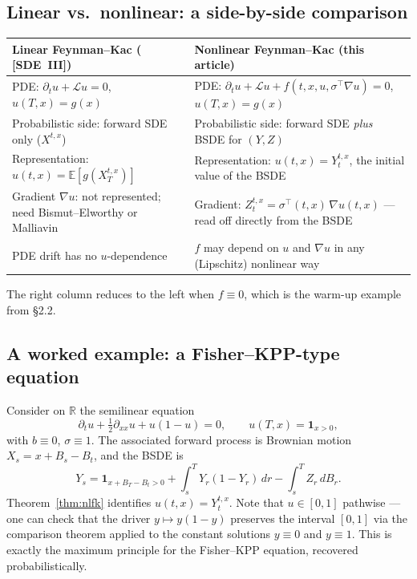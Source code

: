 \documentclass{article}
\newcommand{\E}{\mathbb{E}}
\newcommand{\R}{\mathbb{R}}
\newcommand{\Lc}{\mathcal{L}}
\begin{document}
\subsection{Linear vs.\ nonlinear: a side-by-side comparison}

\begin{center}
\begin{tabular}{p{}|p{}}
\textbf{Linear Feynman--Kac (\,[SDE~III])} & \textbf{Nonlinear Feynman--Kac (this article)} \\
\hline
PDE: $\partial_t u + \Lc u = 0$, $u(T, x) = g(x)$ &
PDE: $\partial_t u + \Lc u + f(t, x, u, \sigma^{\top} \nabla u) = 0$, $u(T, x) = g(x)$ \\
\hline
Probabilistic side: forward SDE only ($X^{t,x}$) &
Probabilistic side: forward SDE \emph{plus} BSDE for $(Y, Z)$ \\
\hline
Representation: $u(t, x) = \E[g(X^{t,x}_T)]$ &
Representation: $u(t, x) = Y^{t,x}_t$, the initial value of the BSDE \\
\hline
Gradient $\nabla u$: not represented; need Bismut--Elworthy or Malliavin &
Gradient: $Z^{t,x}_t = \sigma^{\top}(t, x)\, \nabla u(t, x)$ --- read off directly from the BSDE \\
\hline
PDE drift has no $u$-dependence &
$f$ may depend on $u$ and $\nabla u$ in any (Lipschitz) nonlinear way \\
\end{tabular}
\end{center}

The right column reduces to the left when $f \equiv 0$, which is the warm-up example from \S2.2.

\subsection{A worked example: a Fisher--KPP-type equation}

Consider on $\R$ the semilinear equation
\[
  \partial_t u + \tfrac12 \partial_{xx} u + u(1 - u) = 0, \qquad u(T, x) = \mathbf{1}_{x > 0},
\]
with $b \equiv 0$, $\sigma \equiv 1$. The associated forward process is Brownian motion $X_s = x + B_s - B_t$, and the BSDE is
\[
  Y_s = \mathbf{1}_{x + B_T - B_t > 0} + \int_s^T Y_r(1 - Y_r)\, dr - \int_s^T Z_r\, dB_r.
\]
Theorem~\ref{thm:nlfk} identifies $u(t, x) = Y^{t,x}_t$. Note that $u \in [0, 1]$ pathwise --- one can check that the driver $y \mapsto y(1 - y)$ preserves the interval $[0, 1]$ via the comparison theorem applied to the constant solutions $y \equiv 0$ and $y \equiv 1$. This is exactly the maximum principle for the Fisher--KPP equation, recovered probabilistically.
\end{document}
